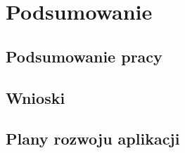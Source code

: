 %


\chapter*{Podsumowanie}

\section*{Podsumowanie pracy}

\section*{Wnioski}

\section*{Plany rozwoju aplikacji}

